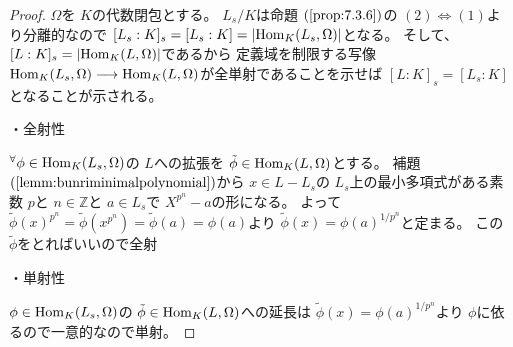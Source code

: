 \documentclass[../master_galois_theory]{subfiles}
\begin{document}
\begin{proof}
  $\Omega$を $K$の代数閉包とする。
  $L_s/K$は命題 $(\mathrm{\ref{prop:7.3.6}})$の $(2) \Leftrightarrow (1)$より分離的なので
  $[L_s:K]_s = [L_s:K] = |\mathrm{Hom}_K(L_s,\Omega)|$となる。
  そして、$[L:K]_s = |\mathrm{Hom}_K(L,\Omega)|$であるから
  定義域を制限する写像
  $\mathrm{Hom}_K(L_s,\Omega) \longrightarrow \mathrm{Hom}_K(L,\Omega)$が全単射であることを示せば
  $[L:K]_s = [L_s:K]$となることが示される。

  ・全射性

  ${}^\forall \phi \in \mathrm{Hom}_K(L_s,\Omega)$の
  $L$への拡張を $\tilde{\phi} \in \mathrm{Hom}_K(L,\Omega)$とする。
  補題 $(\mathrm{\ref{lemm:bunriminimalpolynomial}})$から
  $x \in L - L_s$の $L_s$上の最小多項式がある素数 $p$と $n \in \mathbb{Z}$と $a \in L_s$で $X^{p^n} - a$の形になる。
  よって $\tilde{\phi}(x)^{p^n} = \tilde{\phi}(x^{p^n}) = \tilde{\phi}(a) = \phi(a)$より
  $\tilde{\phi}(x) = \phi(a)^{1/p^n}$と定まる。
  この $\tilde{\phi}$をとればいいので全射

  ・単射性

  $\phi \in \mathrm{Hom}_K(L_s,\Omega)$の $\tilde{\phi} \in \mathrm{Hom}_K(L,\Omega)$への延長は $\tilde{\phi}(x) = \phi(a)^{1/p^n}$より
  $\phi$に依るので一意的なので単射。
\end{proof}

\clearpage
\end{document}
